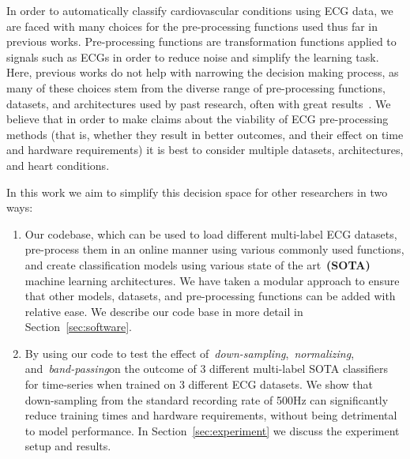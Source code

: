 \documentclass[pmlr,twocolumn]{jmlr}%
\begin{document}
In order to automatically classify cardiovascular conditions using ECG data, we are faced with many choices for the pre-processing functions used thus far in previous works. Pre-processing functions are transformation functions applied to signals such as ECGs in order to reduce noise and simplify the learning task. Here, previous works do not help with narrowing the decision making process, as many of these choices stem from the diverse range of pre-processing functions, datasets, and architectures used by past research, often with great results~\cite{hong2022practical}. We believe that in order to make claims about the viability of ECG pre-processing methods (that is, whether they result in better outcomes, and their effect on time and hardware requirements) it is best to consider multiple datasets, architectures, and heart conditions.  


In this work we aim to simplify this decision space for other researchers in two ways: 
\begin{enumerate}
    \item Our codebase, which can be used to load different multi-label ECG datasets, pre-process them in an online manner using various commonly used functions, and create classification models using various state of the art~\textbf{(SOTA)} machine learning architectures. We have taken a modular approach to ensure that other models, datasets, and pre-processing functions can be added with relative ease. We describe our code base in more detail in Section~\ref{sec:software}.
    \item By using our code to test the effect of~\textit{down-sampling},~\textit{normalizing}, and~\textit{band-passing}on the outcome of 3 different multi-label SOTA classifiers for time-series when trained on 3 different ECG datasets. We show that down-sampling from the standard recording rate of 500Hz can significantly reduce training times and hardware requirements, without being detrimental to model performance. In Section~\ref{sec:experiment} we discuss the experiment setup and results.
\end{enumerate}
\end{document}
